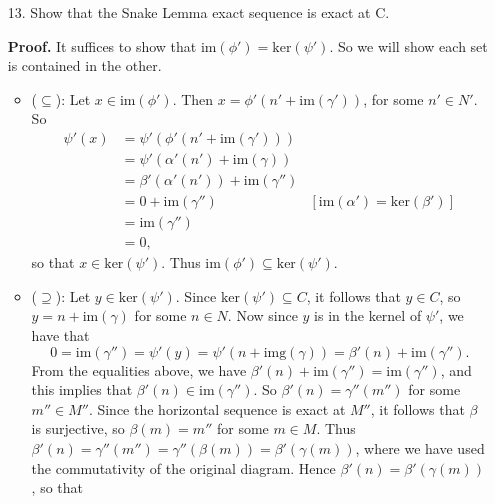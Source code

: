 \documentclass[9pt]{article}
\begin{document}
\begin{enumerate}
   \item[13.]  Show that the Snake Lemma exact sequence is exact at C.

      \textbf{Proof.} It suffices to show that
      $\text{im}(\phi') = \text{ker}(\psi')$. So we will show each set is
      contained in the other.
      \begin{itemize}
         \item ($\subseteq$): Let $x \in \text{im}(\phi')$. Then
               $x = \phi'(n' + \text{im}(\gamma'))$, for some $n' \in N'$. So
               \begin{align*}
                  \psi'(x) &= \psi'(\phi'(n' + \text{im}(\gamma'))) \\
                     &= \psi'(\alpha'(n') + \text{im}(\gamma)) \\
                     &= \beta'(\alpha'(n')) + \text{im}(\gamma'') \\
                     &= 0 + \text{im}(\gamma'')
                        &[\text{im}(\alpha') = \text{ker}(\beta')] \\
                     &= \text{im}(\gamma'') \\
                     &= 0,
               \end{align*}
               so that $x \in \text{ker}(\psi')$. Thus 
               $\text{im}(\phi') \subseteq \text{ker}(\psi')$.
         \item ($\supseteq$): Let $y \in \text{ker}(\psi')$. Since
               $\text{ker}(\psi') \subseteq C$, it follows that $y \in C$, so
               $y = n + \text{im}(\gamma)$ for some $n \in N$. Now since $y$ is
               in the kernel of $\psi'$, we have that
               $$0 = \text{im}(\gamma'') = \psi'(y) =
                 \psi'(n + \text{img}(\gamma)) =
                 \beta'(n) + \text{im}(\gamma'').$$
               From the equalities above, we have
               $\beta'(n) + \text{im}(\gamma'') = \text{im}(\gamma'')$, and this
               implies that $\beta'(n) \in \text{im}(\gamma'')$. So
               $\beta'(n) = \gamma''(m'')$ for some $m'' \in M''$. Since the
               horizontal sequence is exact at $M''$, it follows that $\beta$ is
               surjective, so $\beta(m) = m''$ for some $m \in M$. Thus
               $\beta'(n) = \gamma''(m'') = \gamma''(\beta(m)) =
                \beta'(\gamma(m))$, where we have used the commutativity of the
               original diagram. Hence $\beta'(n) = \beta'(\gamma(m))$, so that

\end{itemize}
\end{enumerate}
\end{document}
